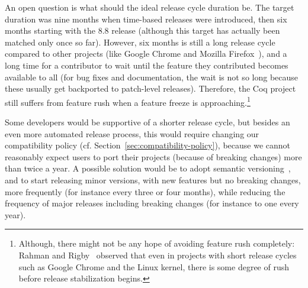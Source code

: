 An open question is what should the ideal release cycle duration be.
The target duration was nine months when time-based releases were introduced, then six months starting with the 8.8 release (although this target has actually been matched only once so far).
However, six months is still a long release cycle compared to other projects (like Google Chrome and Mozilla Firefox~\cite{da2018impact,rahman2015release}), and a long time for a contributor to wait until the feature they contributed becomes available to all (for bug fixes and documentation, the wait is not so long because these usually get backported to patch-level releases).
Therefore, the Coq project still suffers from feature rush when a feature freeze is approaching.\footnote{
	Although, there might not be any hope of avoiding feature rush completely: Rahman and Rigby~\cite{rahman2014contrasting} observed that even in projects with short release cycles such as Google Chrome and the Linux kernel, there is some degree of rush before release stabilization begins.
}

Some developers would be supportive of a shorter release cycle, but besides an even more automated release process, this would require changing our compatibility policy (cf. Section~\ref{sec:compatibility-policy}), because we cannot reasonably expect users to port their projects (because of breaking changes) more than twice a year.
A possible solution would be to adopt semantic versioning~\cite{preston_semantic_versioning}, and to start releasing minor versions, with new features but no breaking changes, more frequently (for instance every three or four months), while reducing the frequency of major releases including breaking changes (for instance to one every year).

